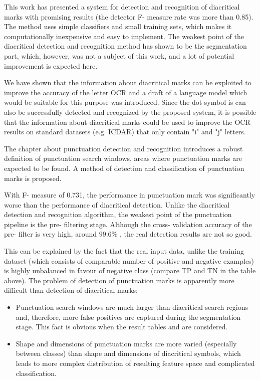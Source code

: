 \documentclass[12pt,a4paper]{report}
\begin{document}
This work has presented a system for detection and recognition of diacritical marks with promising results (the detector F- measure rate was more than 0.85). The method uses simple classifiers and small training sets, which makes it computationally inexpensive and easy to implement. The weakest point of the diacritical detection and recognition method has shown to be the segmentation part, which, however, was not a subject of this work, and a lot of potential improvement is expected here.

We have shown that the information about diacritical marks can be exploited to improve the accuracy of the letter OCR and a draft of a language model which would be suitable for this purpose was introduced. Since the dot symbol is can also be successfully detected and recognized by the proposed system, it is possible that the information about diacritical marks could be used to improve the OCR results on standard datasets (e.g. ICDAR) that only contain "i" and "j" letters.

The chapter about punctuation detection and recognition introduces a robust definition of punctuation search windows, areas where punctuation marks are expected to be found. A method of detection and classification of punctuation marks is proposed.

With F- measure of 0.731, the performance in punctuation mark was significantly worse than the performance of diacritical detection. Unlike the diacritical detection and recognition algorithm, the weakest point of the punctuation pipeline is the pre- filtering stage. Although the cross- validation accuracy of the pre- filter is very high, around $99.6\%$ , the real detection results are not so good.

This can be explained by the fact that the real input data, unlike the training dataset (which consists of comparable number of positive and negative examples) is highly unbalanced in favour of negative class (compare TP and TN in the table above). The problem of detection of punctuation marks is apparently more difficult than detection of diacritical marks:
\begin{itemize}
    \item Punctuation search windows are much larger than diacritical search regions and, therefore, more false positives are captured during the segmentation stage. This fact is obvious when the result tables and are considered.
    \item Shape and dimensions of punctuation marks are more varied (especially between classes) than shape and dimensions of diacritical symbols, which leads to more complex distribution of resulting feature space and complicated classification.
\end{itemize}
\end{document}
